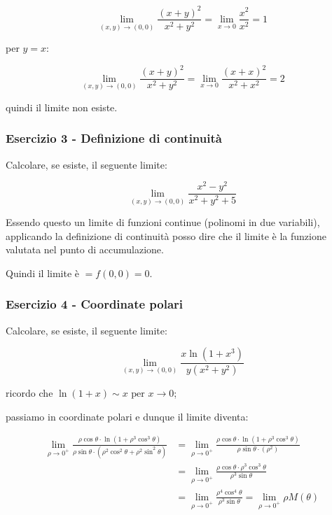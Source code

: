 \[
    \lim_{ (x,y) \to (0,0) } \frac{{(x+y)}^{2}}{x^{2}+y^{2}} = \lim_{ x \to 0 } \frac{x^{2}}{x^{2}} = 1
\]

per \(y=x\):

\[
    \lim_{ (x,y) \to (0,0) } \frac{{(x+y)}^{2}}{x^{2}+y^{2}} = \lim_{ x \to 0 } \frac{{(x+x)}^{2}}{x^{2}+x^{2}} = 2
\]

quindi il limite non esiste.

\filbreak{}
\subsubsection*{Esercizio 3 {-} Definizione di continuità}

Calcolare, se esiste, il seguente limite:

\[
    \lim_{ (x,y) \to (0,0) } \frac{x^{2}-y^{2}}{x^{2}+y^{2}+5}
\]

Essendo questo un limite di funzioni continue (polinomi in due variabili), applicando la definizione di continuità posso dire che il limite è la funzione valutata nel punto di accumulazione.

Quindi il limite è \(= f(0,0) = 0\).

\filbreak{}
\subsubsection*{Esercizio 4 {-} Coordinate polari}

Calcolare, se esiste, il seguente limite:

\[
    \lim_{ (x,y) \to (0,0) } \frac{x\ln(1+x^{3})}{y(x^{2}+y^{2})}
\]

ricordo che \(\ln(1 + x) \sim x \text{ per } x\to0\);

passiamo in coordinate polari e dunque il limite diventa:

\begin{align*}
    \lim_{ \rho \to 0^{+} } \frac{\rho\cos\theta \cdot\ln\left(1+\rho^{3}\cos^{3}\theta \right)}{\rho\sin\theta \cdot\left(\rho^{2}\cos^{2}\theta  + \rho^{2}\sin^{2}\theta \right)} & = \lim_{ \rho \to 0^{+} } \frac{\rho\cos\theta \cdot\ln(1+\rho^{3}\cos^{3}\theta )}{\rho\sin\theta \cdot (\rho^{2}) }  \\
                                                                                                                                                                                     & = \lim_{ \rho \to 0^{+} } \frac{\rho\cos\theta \cdot \rho^{3}\cos^{3}\theta}{\rho^{3}\sin\theta }                      \\
                                                                                                                                                                                     & = \lim_{ \rho \to 0^{+} } \frac{\rho^{4}\cos^{4}\theta }{\rho^{3}\sin\theta } = \lim_{ \rho \to 0^{+} } \rho M(\theta)
\end{align*}

